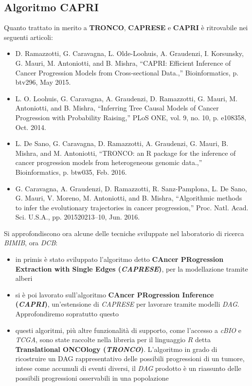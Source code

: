 \documentclass[a4paper,12pt, oneside]{book}
\begin{document}
\subsection{Algoritmo CAPRI}
\begin{shaded}
  Quanto trattato in merito a \textbf{TRONCO}, \textbf{CAPRESE} e \textbf{CAPRI}
  è ritrovabile nei seguenti articoli:
  \begin{itemize}
    \item D. Ramazzotti, G. Caravagna, L. Olde-Loohuis, A. Graudenzi,
    I. Korsunsky, G. Mauri, M. Antoniotti, and B. Mishra, “CAPRI: Efficient
    Inference of Cancer Progression Models from Cross-sectional Data.,”
    Bioinformatics, p. btv296, May 2015.
    \item L. O. Loohuis, G. Caravagna, A. Graudenzi, D. Ramazzotti, G. Mauri,
    M. Antoniotti,  and B. Mishra, “Inferring Tree Causal Models of Cancer
    Progression with Probability Raising,” PLoS ONE, vol. 9, no. 10, p. e108358,
    Oct. 2014.
    \item L. De Sano, G. Caravagna, D. Ramazzotti, A. Graudenzi, G. Mauri,
    B. Mishra, and M. Antoniotti, “TRONCO: an R package for the inference of
    cancer progression models from heterogeneous genomic data.,” Bioinformatics,
    p. btw035, Feb. 2016. 
    \item G. Caravagna, A. Graudenzi, D. Ramazzotti, R. Sanz-Pamplona, L. De
    Sano, G. Mauri, V. Moreno, M. Antoniotti, and B. Mishra, “Algorithmic
    methods to infer the evolutionary trajectories in cancer progression,”
    Proc. Natl. Acad. Sci. U.S.A., pp.  201520213–10, Jun. 2016.
  \end{itemize}
\end{shaded}
Si approfondiscono ora alcune delle tecniche sviluppate nel laboratorio di
ricerca \textit{BIMIB}, ora \textit{DCB}:
\begin{itemize}
  \item in primis è stato sviluppato l'algoritmo detto \textbf{CAncer
    PRogression Extraction with Single Edges (\textit{CAPRESE})}, per la
  modellazione tramite alberi
  \item si è poi lavorato sull'algoritmo \textbf{CAncer PRogression Inference
    (\textit{CAPRI})}, un'estensione di \textit{CAPRESE} per lavorare tramite
  modelli \textit{DAG}. Approfondiremo sopratutto questo
  \item questi algoritmi, più altre funzionalità di supporto, come l'accesso a
  \textit{cBIO} e \textit{TCGA}, sono state raccolte nella libreria per il
  linguaggio $R$ detta \textbf{Translational ONCOlogy
    (\textit{TRONCO})}. L'algoritmo in grado di ricostruire un DAG
  rappresentativo delle possibili progressioni di un tumore, intese come
  accumuli di eventi diversi, il \textit{DAG} prodotto è un riassunto delle
  possibili progressioni osservabili in una popolazione  
\end{itemize}
\end{document}
